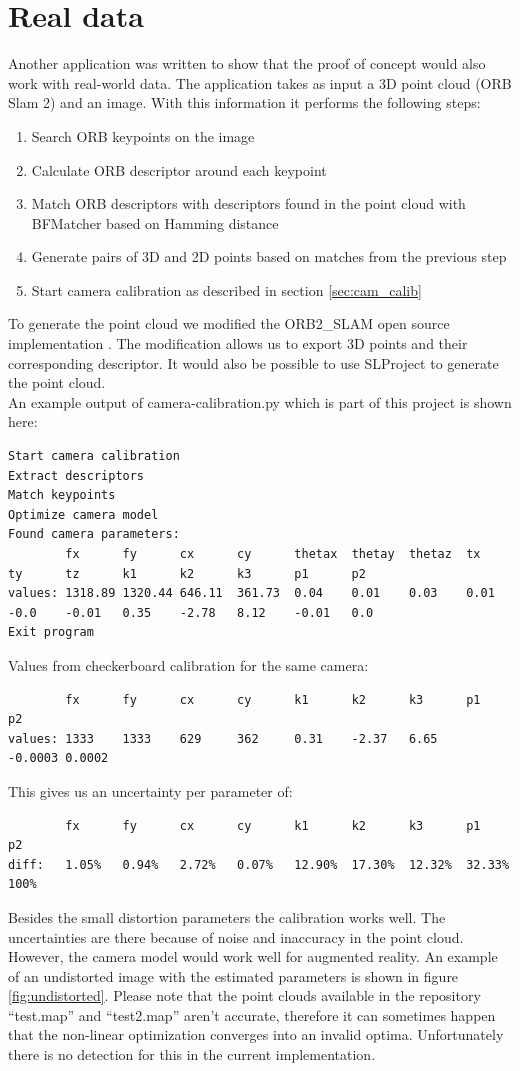 \documentclass[11pt,a4paper,titlepage,oneside]{report}
\begin{document}
\section{Real data}
Another application was written to show that the proof of concept would also work with real-world data. The application takes as input a 3D point cloud (ORB Slam 2) and an image. With this information it performs the following steps:
\begin{enumerate}
	\item Search ORB keypoints on the image
	\item Calculate ORB descriptor around each keypoint
	\item Match ORB descriptors with descriptors found in the point cloud with BFMatcher \cite{BFMatcher} based on Hamming distance
	\item Generate pairs of 3D and 2D points based on matches from the previous step
	\item Start camera calibration as described in section \ref{sec:cam_calib}
\end{enumerate}
To generate the point cloud we modified the ORB2\_SLAM open source implementation \cite{orbslam2_impl}. The modification allows us to export 3D points and their corresponding descriptor. It would also be possible to use SLProject to generate the point cloud.\\

An example output of camera-calibration.py which is part of this project is shown here:
\tiny
\begin{lstlisting}
Start camera calibration
Extract descriptors
Match keypoints
Optimize camera model
Found camera parameters:
        fx      fy      cx      cy      thetax  thetay  thetaz  tx      ty      tz      k1      k2      k3      p1      p2
values: 1318.89 1320.44 646.11  361.73  0.04    0.01    0.03    0.01    -0.0    -0.01   0.35    -2.78   8.12    -0.01   0.0
Exit program
\end{lstlisting}
Values from checkerboard calibration for the same camera:
\begin{lstlisting}
        fx      fy      cx      cy      k1      k2      k3      p1      p2
values: 1333    1333    629     362     0.31    -2.37   6.65    -0.0003 0.0002
\end{lstlisting}
This gives us an uncertainty per parameter of:
\begin{lstlisting}
        fx      fy      cx      cy      k1      k2      k3      p1      p2
diff:   1.05%   0.94%   2.72%   0.07%   12.90%  17.30%  12.32%  32.33% 100%
\end{lstlisting}
\normalsize
Besides the small distortion parameters the calibration works well. The uncertainties are there because of noise and inaccuracy in the point cloud. However, the camera model would work well for augmented reality. An example of an undistorted image with the estimated parameters is shown in figure \ref{fig:undistorted}. Please note that the point clouds available in the repository ``test.map'' and ``test2.map'' aren't accurate, therefore it can sometimes happen that the non-linear optimization converges into an invalid optima. Unfortunately there is no detection for this in the current implementation.
\end{document}
